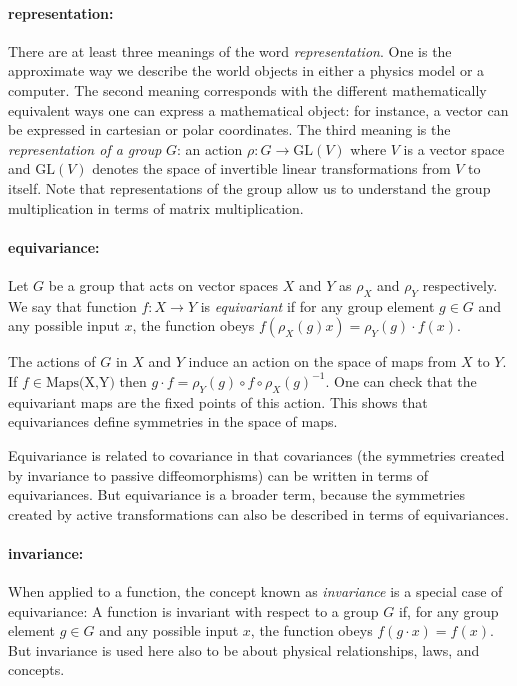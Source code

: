 \documentclass{article}
\begin{document}
\paragraph{representation:} There are at least three meanings of the word \emph{representation}. One is the approximate way we describe the world objects in either a physics model or a computer. The second meaning corresponds with the different mathematically equivalent ways one can express a mathematical object: for instance, a vector can be expressed in cartesian or polar coordinates. The third meaning is the \emph{representation of a group} $G$: an action $\rho: G\to \text{GL}(V)$ where $V$ is a vector space and $\text{GL}(V)$ denotes the space of invertible linear transformations from $V$ to itself. Note that representations of the group allow us to understand the group multiplication in terms of matrix multiplication.

\paragraph{equivariance:}
Let $G$ be a group that acts on vector spaces $X$ and $Y$ as $\rho_X$ and $\rho_Y$ respectively. We say that function $f:X\to Y$ is \emph{equivariant} if for any group element $g\in G$ and any possible input $x$, the function obeys $f( \rho_X(g) x) = \rho_Y(g)\cdot f(x)$.

The actions of $G$ in $X$ and $Y$ induce an action on the space of maps from $X$ to $Y$. If $f\in \text{Maps(X,Y)}$ then $g\cdot f = \rho_Y(g)\circ f \circ \rho_X(g)^{-1}$. One can check that the equivariant maps are the fixed points of this action. This shows that equivariances define symmetries in the space of maps. 

Equivariance is related to covariance in that covariances (the symmetries created by invariance to passive diffeomorphisms) can be written in terms of equivariances.
But equivariance is a broader term, because the symmetries created by active transformations can also be described in terms of equivariances.

\paragraph{invariance:}
When applied to a function, the concept known as \emph{invariance} is a special case of equivariance:
A function is invariant with respect to a group $G$ if, for any group element $g\in G$ and any possible input $x$, the function obeys $f(g\cdot x) = f(x)$.
But invariance is used here also to be about physical relationships, laws, and concepts.
\end{document}
